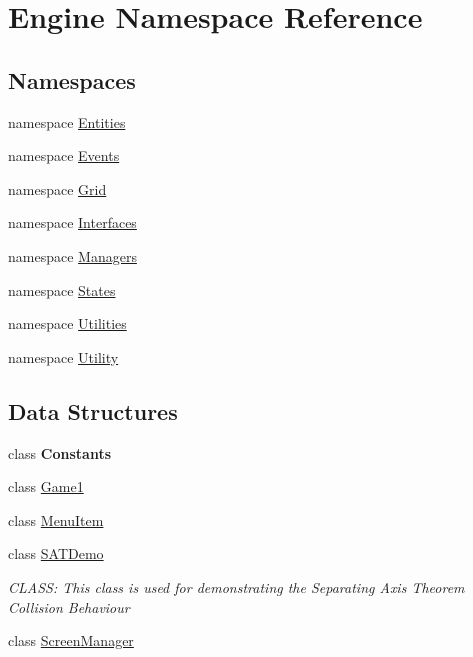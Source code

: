 \hypertarget{a00240}{}\section{Engine Namespace Reference}
\label{a00240}
\subsection*{Namespaces}
\begin{DoxyCompactItemize}
\item 
namespace \hyperlink{a00242}{Entities}
\item 
namespace \hyperlink{a00246}{Events}
\item 
namespace \hyperlink{a00251}{Grid}
\item 
namespace \hyperlink{a00253}{Interfaces}
\item 
namespace \hyperlink{a00239}{Managers}
\item 
namespace \hyperlink{a00277}{States}
\item 
namespace \hyperlink{a00281}{Utilities}
\item 
namespace \hyperlink{a00282}{Utility}
\end{DoxyCompactItemize}
\subsection*{Data Structures}
\begin{DoxyCompactItemize}
\item 
class {\bfseries Constants}
\item 
class \hyperlink{a00306}{Game1}
\item 
class \hyperlink{a00578}{Menu\+Item}
\item 
class \hyperlink{a00566}{S\+A\+T\+Demo}
\begin{DoxyCompactList}\small\item\em C\+L\+A\+SS\+: This class is used for demonstrating the Separating Axis Theorem Collision Behaviour \end{DoxyCompactList}\item 
class \hyperlink{a00538}{Screen\+Manager}
\end{DoxyCompactItemize}
